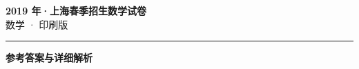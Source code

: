 \documentclass[zihao=5, a4paper]{ctexart}
\begin{document}
\begin{center}
  {\Large\bfseries 2019 年·上海春季招生数学试卷}\\[4pt]
  {\large 数学 · 印刷版}
\end{center}
\medskip
{}

\par\bigskip\hrule\bigskip
{}
\begin{center}{\large\bfseries 参考答案与详细解析}\end{center}
\smallskip

\end{document}
